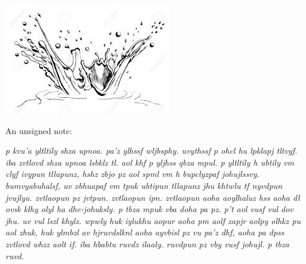 \documentclass[white]{gl2018}
\begin{document}
\name{\wLindenTwo{}}

\begin{center}
\includegraphics[scale=.3]{Water}
\end{center}

An unsigned note:

\begin{changemargin}{3cm}{3cm}
\emph{p kvu’a yltltily shza upnoa. pa’z ylhssf wljbsphy. uvythssf p ohcl hu lpklapj tltvyf. iba zvtlovd shza upnoa lsbklz tl. aol khf p yljhss qbza mpul. p yltltily h ubtily vm clyf ivypun tllapunz, hshz zbjo pz aol spml vm h bupclyzpaf johujlssvy. bumvyabuhalsf, uv xbhuapaf vm tpuk ubtipun tllapunz jhu khtwlu tf nyvdpun jvujlyu. zvtlaopun pz jvtpun. zvtlaopun ipn. zvtlaopun aoha aoylhaluz hss aoha dl ovsk klhy olyl ha dhe-johuksly. p tbza mpuk vba doha pa pz. p’t aol vusf vul dov jhu. uv vul lszl khylz. wpwly huk iylukhu aopur aoha pm aolf zapjr aolpy olhkz pu aol zhuk, huk ylmbzl av hjruvdslknl aoha ayvbisl pz vu pa’z dhf, aoha pa dpss zvtlovd whzz aolt if. iba hbabtu ruvdz ilaaly. ruvdpun pz vby vusf johujl. p tbza ruvd.}
\end{changemargin}
\end{document}
